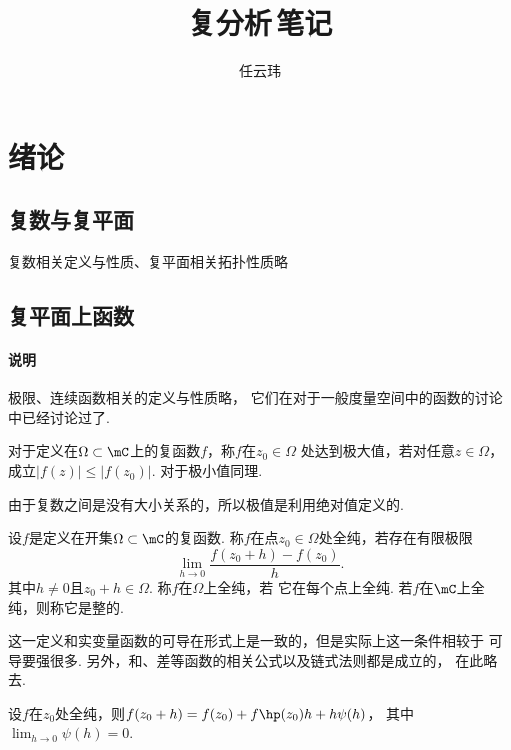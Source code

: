 

\title{复分析$\,$笔记}
\author{任云玮}
\date{}



\maketitle
\tableofcontents
\newpage

\section{绪论}

\subsection{复数与复平面}

  复数相关定义与性质、复平面相关拓扑性质略

\subsection{复平面上函数}

  \paragraph{说明}
    极限、连续函数相关的定义与性质略，
    它们在对于一般度量空间中的函数的讨论中已经讨论过了.

  \begin{defi}[极值]
    对于定义在$\Omega\subset\mC$上的复函数$f$，称$f$在$z_0\in\Omega$
    处达到极大值，若对任意$z\in\Omega$，成立$|f(z)| \le |f(z_0)|$.
    对于极小值同理.
  \end{defi}
  \remark
    由于复数之间是没有大小关系的，所以极值是利用绝对值定义的.

  \begin{defi}
    设$f$是定义在开集$\Omega\subset\mC$的复函数. 称$f$在点$z_0
    \in\Omega$处全纯，若存在有限极限
    \[
      \lim_{h\to 0}\frac{f(z_0+h) - f(z_0)}{h}.
    \]
    其中$h\ne 0$且$z_0+h\in\Omega$. 称$f$在$\Omega$上全纯，若
    它在每个点上全纯. 若$f$在$\mC$上全纯，则称它是整的.
  \end{defi}
  \remark
    这一定义和实变量函数的可导在形式上是一致的，但是实际上这一条件相较于
    可导要强很多. 另外，和、差等函数的相关公式以及链式法则都是成立的，
    在此略去.

  \begin{pos}[有限增量公式]
    设$f$在$z_0$处全纯，则$f(z_0+h)=f(z_0)+f\hp(z_0)h + h\psi(h)$，
    其中$\lim_{h\to 0}\psi(h)=0$.
  \end{pos}

